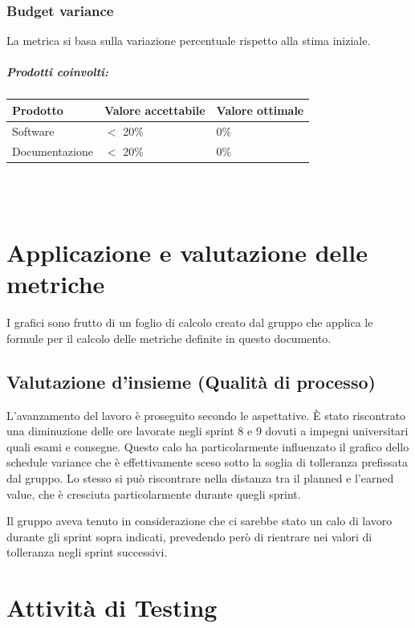 \documentclass[a4paper, 12pt]{article}
\begin{document}
\subsubsection{Budget variance}
La metrica si basa sulla variazione percentuale rispetto alla stima iniziale.

\subparagraph{Prodotti coinvolti:}
\begin{center}
	\begin{tabularx}{\textwidth}{|X|X|X|}
		\hline
		\textbf{Prodotto} & \textbf{Valore accettabile } & \textbf{Valore ottimale } \\
		\hline
		Software          & $<$ 20\%                     & 0\%                       \\
		\hline
		Documentazione    & $<$ 20\%                     & 0\%                       \\
		\hline
	\end{tabularx}\\[8pt]
	\mbox{}\\
\end{center}

\section {Applicazione e valutazione delle metriche}
I grafici sono frutto di un foglio di calcolo creato dal gruppo che applica le formule per il calcolo delle metriche definite in questo documento.
\subsection{Valutazione d’insieme (Qualità di processo)}
L'avanzamento del lavoro è proseguito secondo le aspettative.
È stato riscontrato una diminuzione delle ore lavorate negli sprint 8 e 9 dovuti 
a impegni universitari quali esami e consegne. 
Questo calo ha particolarmente 
influenzato il grafico dello schedule variance che è effettivamente sceso sotto la soglia di tolleranza prefissata dal gruppo. 
Lo stesso si può riscontrare nella distanza tra il planned e l’earned value, che 
è cresciuta particolarmente durante quegli sprint. 

Il gruppo aveva tenuto in considerazione che ci sarebbe stato un calo di lavoro durante gli sprint sopra indicati, prevedendo però di rientrare nei valori di tolleranza negli sprint successivi.



\section{Attività di Testing}
\end{document}
